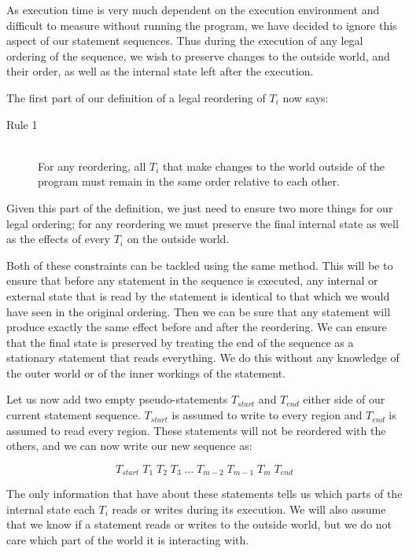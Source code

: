 \documentclass[twoside,a4paper]{report}
\begin{document}
As execution time is very much dependent on the execution environment and difficult to measure without running the program, we have decided to ignore this aspect
of our statement sequences. Thus during the execution of any legal ordering of the sequence, we wish to preserve changes to the outside world, and their order,
as well as the internal state left after the execution.

The first part of our definition of a legal reordering of $T_i$ now says:

\begin{description}
\item[Rule 1] \hfill \\
For any reordering, all $T_i$ that make changes to the world outside of the program must remain in the same order relative to each other.
\end{description}

Given this part of the definition, we just need to ensure two more things for our legal ordering; for any reordering we must preserve the final internal
state as well as the effects of every $T_i$ on the outside world.

Both of these constraints can be tackled using the same method. This will be to ensure that before any statement in the sequence is executed, any internal
or external state that is read by the statement is identical to that which we would have seen in the original ordering. Then we can be sure that any statement
will produce exactly the same effect before and after the reordering. We can ensure that the final state is preserved by treating the end of the sequence as
a stationary statement that reads everything. We do this without any knowledge of the outer world or of the inner workings of the statement.

Let us now add two empty pseudo-statements $T_{start}$ and $T_{end}$ either side of our current statement sequence. $T_{start}$ is assumed to write to every
region and $T_{end}$ is assumed to read every region. These statements will not be reordered with the others, and we can now write our new sequence as:

$$T_{start} \; T_1 \; T_2 \; T_3 \; \ldots \; T_{m-2} \; T_{m-1} \; T_m \; T_{end}$$

The only information that have about these statements tells us which parts of the internal state each $T_i$ reads or writes during its execution. We will
also assume that we know if a statement reads or writes to the outside world, but we do not care which part of the world it is interacting with.
\end{document}
